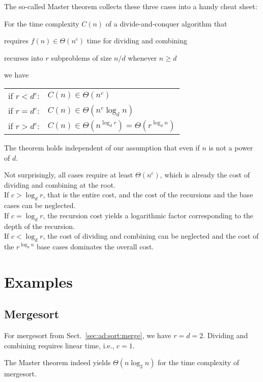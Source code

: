 The so-called Master theorem collects these three cases into a handy cheat sheet:

\begin{theorem}
For the time complexity $C(n)$ of a divide-and-conquer algorithm that
\begin{compactitem}
 \item requires $f(n)\in\Theta(n^c)$ time for dividing and combining
 \item recurses into $r$ subproblems of size $n/d$ whenever $n\geq d$
\end{compactitem}
we have
\begin{center}
\begin{tabular}{ll}
if $r<d^c$: & $C(n)\in\Theta(n^c)$ \\
if $r=d^c$: & $C(n)\in\Theta(n^c\log_d n)$ \\
if $r>d^c$: & $C(n)\in\Theta(n^{\log_d r})=\Theta(r^{\log_d n})$ \\
\end{tabular}
\end{center}
\end{theorem}

The theorem holds independent of our assumption that even if $n$ is not a power of $d$.

Not surprisingly, all cases require at least $\Theta(n^c)$, which is already the cost of dividing and combining at the root.\\
If $c>\log_d r$, that is the entire cost, and the cost of the recursions and the base cases can be neglected.\\
If $c=\log_d r$, the recursion cost yields a logarithmic factor corresponding to the depth of the recursion.\\
If $c<\log_d r$, the cost of dividing and combining can be neglected and the cost of the $r^{\log_d n}$ base cases dominates the overall cost.

\section{Examples}

\subsection{Mergesort}

For mergesort from Sect.~\ref{sec:ad:sort:merge}, we have $r=d=2$.
Dividing and combining requires linear time, i.e., $c=1$.

The Master theorem indeed yields $\Theta(n\log_2 n)$ for the time complexity of mergesort.

